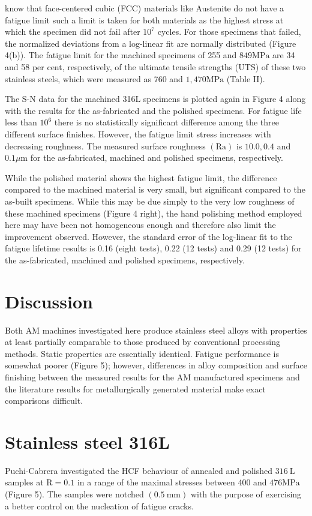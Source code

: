 \documentclass[10pt]{article}
\begin{document}
know that face-centered cubic (FCC) materials like Austenite do not have a fatigue limit such a limit is taken for both materials as the highest stress at which the specimen did not fail after $10^{7}$ cycles. For those specimens that failed, the normalized deviations from a log-linear fit are normally distributed (Figure 4(b)). The fatigue limit for the machined specimens of 255 and $849 \mathrm{MPa}$ are 34 and 58 per cent, respectively, of the ultimate tensile strengths (UTS) of these two stainless steels, which were measured as 760 and $1,470 \mathrm{MPa}$ (Table II).

The S-N data for the machined 316L specimens is plotted again in Figure 4 along with the results for the as-fabricated and the polished specimens. For fatigue life less than $10^{6}$ there is no statistically significant difference among the three different surface finishes. However, the fatigue limit stress increases with decreasing roughness. The measured surface roughness $(\mathrm{Ra})$ is $10.0,0.4$ and $0.1 \mu \mathrm{m}$ for the as-fabricated, machined and polished specimens, respectively.

While the polished material shows the highest fatigue limit, the difference compared to the machined material is very small, but significant compared to the as-built specimens. While this may be due simply to the very low roughness of these machined specimens (Figure 4 right), the hand polishing method employed here may have been not homogeneous enough and therefore also limit the improvement observed. However, the standard error of the log-linear fit to the fatigue lifetime results is 0.16 (eight tests), 0.22 (12 tests) and 0.29 (12 tests) for the as-fabricated, machined and polished specimens, respectively.

\section*{Discussion}
Both AM machines investigated here produce stainless steel alloys with properties at least partially comparable to those produced by conventional processing methods. Static properties are essentially identical. Fatigue performance is somewhat poorer (Figure 5); however, differences in alloy composition and surface finishing between the measured results for the AM manufactured specimens and the literature results for metallurgically generated material make exact comparisons difficult.

\section*{Stainless steel 316L}
Puchi-Cabrera investigated the HCF behaviour of annealed and polished $316 \mathrm{~L}$ samples at $\mathrm{R}=0.1$ in a range of the maximal stresses between 400 and $476 \mathrm{MPa}$ (Figure 5). The samples were notched $(0.5 \mathrm{~mm})$ with the purpose of exercising a better control on the nucleation of fatigue cracks.
\end{document}

